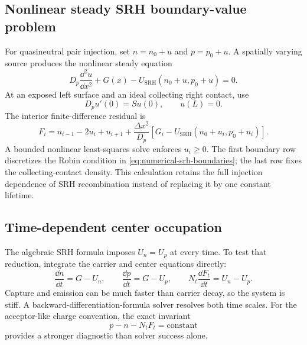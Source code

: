 \subsection{Nonlinear steady SRH boundary-value problem}

For quasineutral pair injection, set
$n=n_0+u$ and $p=p_0+u$.  A spatially varying source produces the nonlinear
steady equation
\begin{equation}
  D_p\frac{\dd^2u}{\dd x^2}+G(x)
  -U_{\mathrm{SRH}}(n_0+u,p_0+u)=0.
  \label{eq:nonlinear-srh-boundary-problem}
\end{equation}
At an exposed left surface and an ideal collecting right contact, use
\begin{equation}
  D_pu'(0)=Su(0),
  \qquad
  u(L)=0.
  \label{eq:numerical-srh-boundaries}
\end{equation}
The interior finite-difference residual is
\begin{equation}
  F_i=u_{i-1}-2u_i+u_{i+1}
  +\frac{\Delta x^2}{D_p}
  \left[G_i-U_{\mathrm{SRH}}(n_0+u_i,p_0+u_i)\right].
  \label{eq:nonlinear-srh-fd-residual}
\end{equation}
A bounded nonlinear least-squares solve enforces $u_i\ge0$.  The first boundary
row discretizes the Robin condition in \cref{eq:numerical-srh-boundaries}; the
last row fixes the collecting-contact density.  This calculation retains the
full injection dependence of SRH recombination instead of replacing it by one
constant lifetime.

\subsection{Time-dependent center occupation}

The algebraic SRH formula imposes $U_n=U_p$ at every time.  To test that
reduction, integrate the carrier and center equations directly:
\begin{equation}
  \frac{\dd n}{\dd t}=G-U_n,
  \qquad
  \frac{\dd p}{\dd t}=G-U_p,
  \qquad
  N_t\frac{\dd F_t}{\dd t}=U_n-U_p.
  \label{eq:dynamic-center-system}
\end{equation}
Capture and emission can be much faster than carrier decay, so the system is
stiff.  A backward-differentiation-formula solver resolves both time scales.
For the acceptor-like charge convention, the exact invariant
\begin{equation}
  p-n-N_tF_t=\text{constant}
  \label{eq:dynamic-center-charge-invariant}
\end{equation}
provides a stronger diagnostic than solver success alone.

